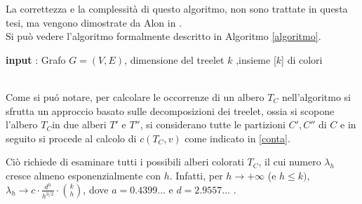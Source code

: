  La correttezza e la complessit\`a di questo algoritmo, non sono trattate in questa tesi, ma vengono dimostrate da Alon in \cite{alon1995color}.\\
 Si pu\`o vedere l'algoritmo formalmente  descritto in Algoritmo \ref{algoritmo}.\\


\begin{algorithm}[H]
	\caption{Algoritmo per il conteggio del numero di occorrenze di $ k $-treelet ben-colorati in $ G $}
	\label{algoritmo}
	\SetAlgoLined
 	\textbf{input} : Grafo $ G =(V,E) $, dimensione del treelet $ k $ ,insieme [$ k $] di colori\;	
 			
\end{algorithm}\mbox{}\\

Come si pu\'o notare, per calcolare le occorrenze di un albero $ T_C $ nell'algoritmo si sfrutta un approccio basato sulle decomposizioni dei treelet, ossia si scopone l'albero $ T_C $in due alberi $ T' $ e $ T'' $, si considerano tutte le partizioni $ C',C''$ di $C$ e in seguito si procede al calcolo di $ c(T_C,v) $ come indicato in \eqref{conta}.

Ciò richiede di esaminare tutti i possibili alberi colorati $T_C$, il cui numero $\lambda_h$ cresce almeno esponenzialmente con $h$. Infatti, per $h \to +\infty$ (e $h \le k)$, $\lambda_h \to c \cdot \frac{d^h}{h^{3/2}} \cdot \binom{k}{h}$, dove $a=0.4399\dots$ e $d=2.9557\dots$ \cite{TODO}.





